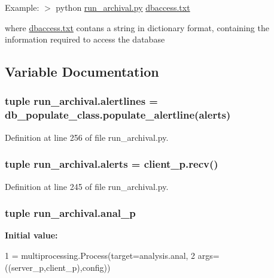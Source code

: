 Example\-: $>$ python \hyperlink{run__archival_8py}{run\-\_\-archival.\-py} \hyperlink{dbaccess_8txt}{dbaccess.\-txt}

where \hyperlink{dbaccess_8txt}{dbaccess.\-txt} contans a string in dictionary format, containing the information required to access the database 

\subsection{Variable Documentation}
\hypertarget{namespacerun__archival_a589caa564ea001aef6438ad3603fb021}{
\subsubsection[{alertlines}]{\setlength{\rightskip}{0pt plus 5cm}tuple run\-\_\-archival.\-alertlines = db\-\_\-populate\-\_\-class.\-populate\-\_\-alertline({\bf alerts})}}\label{namespacerun__archival_a589caa564ea001aef6438ad3603fb021}


Definition at line 256 of file run\-\_\-archival.\-py.

\hypertarget{namespacerun__archival_af84da43386d4cf1664600fe963e0cc67}{
\subsubsection[{alerts}]{\setlength{\rightskip}{0pt plus 5cm}tuple run\-\_\-archival.\-alerts = client\-\_\-p.\-recv()}}\label{namespacerun__archival_af84da43386d4cf1664600fe963e0cc67}


Definition at line 245 of file run\-\_\-archival.\-py.

\hypertarget{namespacerun__archival_ae9e6113a713c17cde32e43834a99436a}{
\subsubsection[{anal\-\_\-p}]{\setlength{\rightskip}{0pt plus 5cm}tuple run\-\_\-archival.\-anal\-\_\-p}}\label{namespacerun__archival_ae9e6113a713c17cde32e43834a99436a}
{\bfseries Initial value\-:}
\begin{DoxyCode}
1 = multiprocessing.Process(target=analysis.anal,
2                     args=((server\_p,client\_p),config))
\end{DoxyCode}


